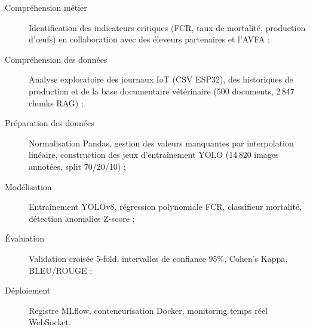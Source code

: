 \documentclass[12pt,a4paper,twoside]{report}
\newcounter{hi}
\begin{document}
\begin{description}
  \item[Compréhension métier] Identification des indicateurs critiques
  (FCR, taux de mortalité, production d'œufs) en collaboration avec des
  éleveurs partenaires et l'AVFA ;
  \item[Compréhension des données] Analyse exploratoire des journaux IoT
  (CSV ESP32), des historiques de production et de la base documentaire
  vétérinaire (500 documents, 2\,847 chunks RAG) ;
  \item[Préparation des données] Normalisation Pandas, gestion des
  valeurs manquantes par interpolation linéaire, construction des jeux
  d'entraînement YOLO (14\,820 images annotées, split 70/20/10) ;
  \item[Modélisation] Entraînement YOLOv8, régression polynomiale FCR,
  classifieur mortalité, détection anomalies Z-score ;
  \item[Évaluation] Validation croisée 5-fold, intervalles de confiance
  95\%, Cohen's Kappa, BLEU/ROUGE ;
  \item[Déploiement] Registre MLflow, conteneurisation Docker, monitoring
  temps réel WebSocket.
\end{description}
\end{document}
